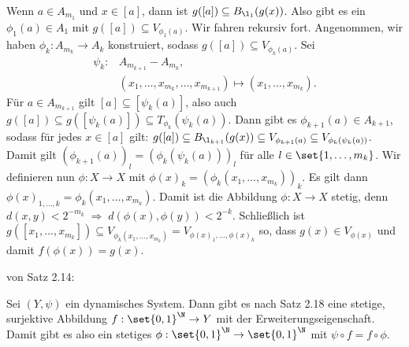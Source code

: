 \begin{beweis}
  Wenn $a \in A_{m_1}$ und $x \in [a]$, dann ist $g([a]) \subseteq B_{\l_1}(g(x))$. Also gibt es ein $\phi_1(a) \in A_1$ mit $g([a]) \subseteq V_{\phi_1(a)}$. Wir fahren rekursiv fort. Angenommen, wir haben $\phi_k: A_{m_k} \to A_k$ konstruiert, sodass $g([a]) \subseteq V_{\phi_k(a)}$. Sei
  \begin{align*}
    \psi_k:& A_{m_{k+1}} - A_{m_{k}},\\
    &(x_1, \dots, x_{m_k}, \dots, x_{m_{k+1}}) \mapsto (x_1, \dots, x_{m_k}).
  \end{align*}
  Für $a \in A_{m_{k+1}}$ gilt $[a] \subseteq [\psi_k(a)]$, also auch $g([a]) \subseteq g([\psi_k(a)]) \subseteq T_{\phi_k}(\psi_k(a))$. Dann gibt es $\phi_{k+1}(a) \in A_{k+1}$, sodass für jedes $x \in [a]$ gilt: $g([a]) \subseteq B_{\l_{k+1}}(g(x)) \subseteq V_{\phi_{k+1}(a)} \subseteq V_{\phi_k(\psi_k(a))}$. Damit gilt $(\phi_{k+1}(a))_l = (\phi_{k}(\psi_k(a)))_l $ für alle $l \in \set{1, \dots, m_k}$. Wir definieren nun $\phi:X \to X$ mit $\phi(x)_k = (\phi_k(x_1, \dots, x_{m_k}))_k$. Es gilt dann $\phi(x)_{1, \dots, k} = \phi_k(x_1, \dots, x_{m_k})$. Damit ist die Abbildung $\phi:X \to X$ stetig, denn $d(x, y)< 2^{-m_k} \; \Rightarrow \; d(\phi(x), \phi(y))<2^{-k}$. Schließlich ist $g([x_1, \dots, x_{m_k}]) \subseteq V_{\phi_k(x_1, \dots, x_{m_k})} = V_{\phi(x)_1, \dots, \phi(x)_k}$ so, dass $g(x) \in V_{\phi(x)}$ und damit $f(\phi(x)) = g(x)$.
\end{beweis}

\begin{beweis} von Satz 2.14:

  Sei $(Y, \psi)$ ein dynamisches System. Dann gibt es nach Satz 2.18 eine stetige, surjektive Abbildung $f: \set{0, 1}^\N \to Y$ mit der Erweiterungseigenschaft. Damit gibt es also ein stetiges $\phi: \set{0, 1}^\N \to \set{0, 1}^\N$ mit $\psi \circ f = f \circ \phi$.
\end{beweis}

